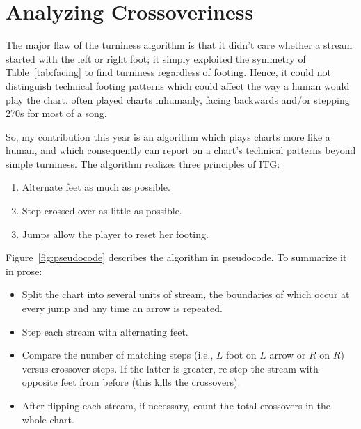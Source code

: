 \documentclass[10pt]{sigplanconf}
\begin{document}


\section{Analyzing Crossoveriness}

The major flaw of the turniness algorithm \cite{turniness}
is that it didn't care whether a stream started with the left or right foot;
it simply exploited the symmetry of Table~\ref{tab:facing} to find turniness regardless of footing.
Hence, it could not distinguish technical footing patterns which could affect the way a human would play the chart.
\cite{turniness} often played charts inhumanly, facing backwards and/or stepping 270s for most of a song.

So, my contribution this year is an algorithm which plays charts more like a human,
and which consequently can report on a chart's technical patterns beyond simple turniness.
The algorithm realizes three principles of ITG:
\begin{enumerate}
	\item Alternate feet as much as possible.
	\item Step crossed-over as little as possible.
	\item Jumps allow the player to reset her footing.
\end{enumerate}

Figure~\ref{fig:pseudocode} describes the algorithm in pseudocode.
To summarize it in prose:
\begin{itemize}
	\item Split the chart into several units of stream,
		the boundaries of which occur at every jump and any time an arrow is repeated.
	\item Step each stream with alternating feet.
	\item Compare the number of matching steps (i.e., $L$ foot on $L$ arrow or $R$ on $R$) versus crossover steps.
		If the latter is greater, re-step the stream with opposite feet from before (this kills the crossovers).
	\item After flipping each stream, if necessary, count the total crossovers in the whole chart.
\end{itemize}

\newcommand\hilight[2]{\color{#1}#2\color{black}}
\end{document}
